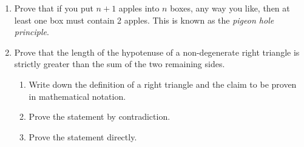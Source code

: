 \documentclass[11pt]{article}
\begin{document}
\begin{enumerate}
\item Prove that if you put $n+1$ apples into $n$ boxes, any way you like, then at least one box must contain 2 apples.  This is known as the {\em pigeon hole principle}.


\item Prove that the length of the hypotenuse of a non-degenerate right triangle is strictly greater than the sum of the two remaining sides.
\begin{enumerate}
\item Write down the definition of a right triangle and the claim to be proven in mathematical notation.
\item Prove the statement by contradiction.
\item Prove the statement directly.
\end{enumerate}


\end{enumerate}
\end{document}
